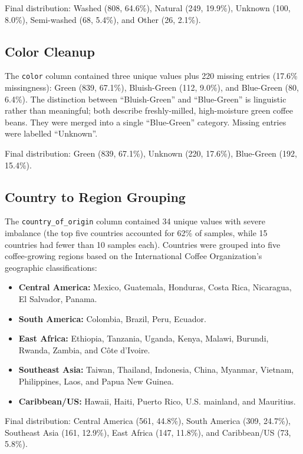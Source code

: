 \documentclass[12pt, a4paper]{article}
\begin{document}
Final distribution: Washed (808, 64.6\%), Natural (249, 19.9\%), Unknown (100, 8.0\%),
Semi-washed (68, 5.4\%), and Other (26, 2.1\%).

\subsection{Color Cleanup}

The \texttt{color} column contained three unique values plus 220 missing entries (17.6\%
missingness): Green (839, 67.1\%), Bluish-Green (112, 9.0\%), and Blue-Green (80, 6.4\%).
The distinction between ``Bluish-Green'' and ``Blue-Green'' is linguistic rather than meaningful;
both describe freshly-milled, high-moisture green coffee beans. They were merged into a single
``Blue-Green'' category. Missing entries were labelled ``Unknown''.

Final distribution: Green (839, 67.1\%), Unknown (220, 17.6\%), Blue-Green (192, 15.4\%).

\subsection{Country to Region Grouping}

The \texttt{country\_of\_origin} column contained 34 unique values with severe imbalance
(the top five countries accounted for 62\% of samples, while 15 countries had fewer than 10
samples each). Countries were grouped into five coffee-growing regions based on the International
Coffee Organization's geographic classifications:

\begin{itemize}
  \item \textbf{Central America:} Mexico, Guatemala, Honduras, Costa Rica, Nicaragua,
        El Salvador, Panama.
  \item \textbf{South America:} Colombia, Brazil, Peru, Ecuador.
  \item \textbf{East Africa:} Ethiopia, Tanzania, Uganda, Kenya, Malawi, Burundi, Rwanda,
        Zambia, and C\^{o}te d'Ivoire.
  \item \textbf{Southeast Asia:} Taiwan, Thailand, Indonesia, China, Myanmar, Vietnam,
        Philippines, Laos, and Papua New Guinea.
  \item \textbf{Caribbean/US:} Hawaii, Haiti, Puerto Rico, U.S. mainland, and Mauritius.
\end{itemize}

Final distribution: Central America (561, 44.8\%), South America (309, 24.7\%), Southeast Asia
(161, 12.9\%), East Africa (147, 11.8\%), and Caribbean/US (73, 5.8\%).
\end{document}
